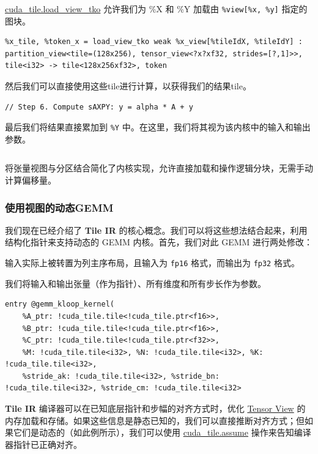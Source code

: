 \documentclass{article}
\begin{document}
\href{https://docs.nvidia.com/cuda/tile-ir/latest/sections/operations.html#op-cuda-tile-load-view-tko}{cuda\_tile.load\_view\_tko} 允许我们为 \%X 和 \%Y 加载由 \texttt{\%view[\%x, \%y]} 指定的图块。


\begin{lstlisting}
%x_tile, %token_x = load_view_tko weak %x_view[%tileIdX, %tileIdY] :
partition_view<tile=(128x256), tensor_view<?x?xf32, strides=[?,1]>>, tile<i32> -> tile<128x256xf32>, token
\end{lstlisting}

然后我们可以直接使用这些tile进行计算，以获得我们的结果tile。


\begin{lstlisting}
// Step 6. Compute sAXPY: y = alpha * A + y
\end{lstlisting}

最后我们将结果直接累加到 \texttt{\%Y} 中。在这里，我们将其视为该内核中的输入和输出参数。


\begin{lstlisting}
\end{lstlisting}

将张量视图与分区结合简化了内核实现，允许直接加载和操作逻辑分块，无需手动计算偏移量。



\subsubsection{使用视图的动态GEMM}

我们现在已经介绍了 \textbf{Tile IR} 的核心概念。我们可以将这些想法结合起来，利用结构化指针来支持动态的 GEMM 内核。首先，我们对此 GEMM 进行两处修改：

输入实际上被转置为列主序布局，且输入为 \texttt{fp16} 格式，而输出为 \texttt{fp32} 格式。


我们将输入和输出张量（作为指针）、所有维度和所有步长作为参数。


\begin{lstlisting}
entry @gemm_kloop_kernel(
    %A_ptr: !cuda_tile.tile<!cuda_tile.ptr<f16>>,
    %B_ptr: !cuda_tile.tile<!cuda_tile.ptr<f16>>,
    %C_ptr: !cuda_tile.tile<!cuda_tile.ptr<f32>>,
    %M: !cuda_tile.tile<i32>, %N: !cuda_tile.tile<i32>, %K: !cuda_tile.tile<i32>,
    %stride_ak: !cuda_tile.tile<i32>, %stride_bn: !cuda_tile.tile<i32>, %stride_cm: !cuda_tile.tile<i32>
\end{lstlisting}

\textbf{Tile IR} 编译器可以在已知底层指针和步幅的对齐方式时，优化 \href{https://docs.nvidia.com/cuda/tile-ir/latest/sections/types.html#type-tensor-view}{Tensor View} 的内存加载和存储。如果这些信息是静态已知的，我们可以直接推断对齐方式；但如果它们是动态的（如此例所示），我们可以使用 \href{https://docs.nvidia.com/cuda/tile-ir/latest/sections/operations.html#op-cuda-tile-assume}{cuda\_tile.assume} 操作来告知编译器指针已正确对齐。
\end{document}
